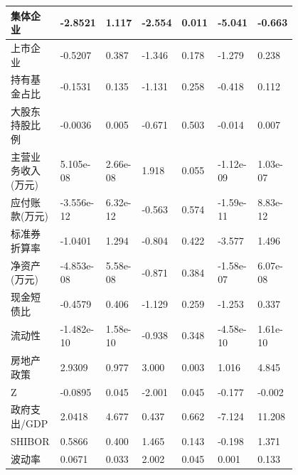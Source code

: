 \begin{center}
\begin{longtable}{p{0.18\linewidth}p{0.1\linewidth}p{0.1\linewidth}p{0.1\linewidth}p{0.1\linewidth}p{0.12\linewidth}p{0.1\linewidth}}
		集体企业           & -2.8521       & 1.117            & -2.554     & 0.011          & -5.041          & -0.663          \\ \hline
		上市企业           & -0.5207       & 0.387            & -1.346     & 0.178          & -1.279          & 0.238           \\ \hline
		持有基金占比       & -0.1531       & 0.135            & -1.131     & 0.258          & -0.418          & 0.112           \\ \hline
		大股东持股比例     & -0.0036       & 0.005            & -0.671     & 0.503          & -0.014          & 0.007           \\ \hline
		主营业务收入(万元) & 5.105e-08     & 2.66e-08         & 1.918      & 0.055          & -1.12e-09       & 1.03e-07        \\ \hline
		应付账款(万元)     & -3.556e-12    & 6.32e-12         & -0.563     & 0.574          & -1.59e-11       & 8.83e-12        \\ \hline
		标准券折算率       & -1.0401       & 1.294            & -0.804     & 0.422          & -3.577          & 1.496           \\ \hline
		净资产(万元)       & -4.853e-08    & 5.58e-08         & -0.871     & 0.384          & -1.58e-07       & 6.07e-08        \\ \hline
		现金短债比         & -0.4579       & 0.406            & -1.129     & 0.259          & -1.253          & 0.337           \\ \hline
		流动性             & -1.482e-10    & 1.58e-10         & -0.938     & 0.348          & -4.58e-10       & 1.61e-10        \\ \hline
		房地产政策         & 2.9309        & 0.977            & 3.000      & 0.003          & 1.016           & 4.845           \\ \hline
		Z                  & -0.0895       & 0.045            & -2.001     & 0.045          & -0.177          & -0.002          \\ \hline
		政府支出/GDP       & 2.0418        & 4.677            & 0.437      & 0.662          & -7.124          & 11.208          \\ \hline
		SHIBOR             & 0.5866        & 0.400            & 1.465      & 0.143          & -0.198          & 1.371           \\ \hline
		波动率             & 0.0671        & 0.033            & 2.002      & 0.045          & 0.001           & 0.133           \\ \hline

\end{longtable}
\end{center}
